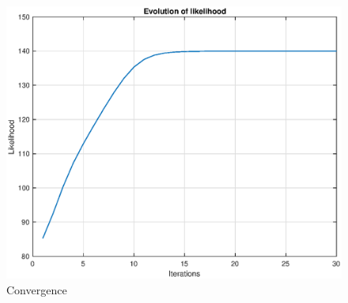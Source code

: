 \begin{figure}[H]
\centering
\includegraphics[scale=0.55]{fig/em_iterations.eps}
\caption[Convergence of pattern fitting]{Convergence }
\label{fig:convergence}
\end{figure}